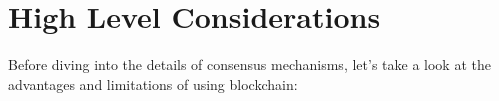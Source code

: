 \section{High Level Considerations}

Before diving into the details of consensus mechanisms, let's take a look at the advantages and limitations of using blockchain:


